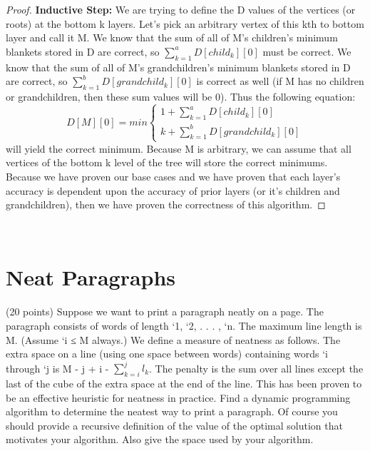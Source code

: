 \documentclass[11pt, solution, letterpaper]{format}
\begin{document}
\begin{proof}
\textbf{Inductive Step:} We are trying to define the D values of the vertices (or roots) at the bottom k layers. Let's pick an arbitrary vertex of this kth to bottom layer and call it M. We know that the sum of all of M's children's minimum blankets stored in D are correct, so $\sum_{k=1}^{a} D[child_k][0]$ must be correct. We know that the sum of all of M's grandchildren's minimum blankets stored in D are correct, so $\sum_{k=1}^{b} D[grandchild_k][0]$ is correct as well (if M has no children or grandchildren, then these sum values will be 0). Thus the following equation:
 \[
  D[M][0] = min 
  \begin{cases}
                                   1 + \sum_{k=1}^{a} D[child_k][0] \\
                    k + \sum_{k=1}^{b} D[grandchild_k][0] 
                               
  \end{cases}
\]
will yield the correct minimum. Because M is arbitrary, we can assume that all vertices of the bottom k level of the tree will store the correct minimums. Because we have proven our base cases and we have proven that each layer's accuracy is dependent upon the accuracy of prior layers (or it's children and grandchildren), then we have proven the correctness of this algorithm. \end{proof}\\

\clearpage
\section{Neat Paragraphs}
(20 points) Suppose we want to print a paragraph neatly on a page. The paragraph consists of words of length
`1, `2, . . . , `n. The maximum line length is M. (Assume `i ≤ M always.) We define a measure of neatness as follows.
The extra space on a line (using one space between words) containing words `i
through `j is M - j + i -
$\sum_{k=i}^{j} l_k$. The penalty is the sum over all lines except the last of the cube of the extra space at the end of the line. This has been proven to be an effective heuristic for neatness in practice. Find a dynamic programming algorithm to determine
the neatest way to print a paragraph. Of course you should provide a recursive definition of the value of the optimal
solution that motivates your algorithm. Also give the space used by your algorithm.\\
\end{document}
